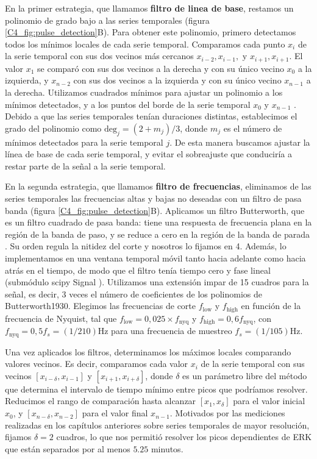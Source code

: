 \documentclass[./main.tex]{subfiles}
\begin{document}
En la primer estrategia, que llamamos \textbf{filtro de linea de base}, restamos un polinomio de grado bajo a las series temporales (figura \ref{C4_fig:pulse_detection}B). Para obtener este polinomio, primero detectamos todos los mínimos locales de cada serie temporal. Comparamos cada punto $x_i$ de la serie temporal con sus dos vecinos más cercanos $x_{i-2},x_{i-1}, \text{ y } x_{i+1},x_{i+1}$. El valor $x_1$ se comparó con sus dos vecinos a la derecha y con su único vecino $x_0$ a la izquierda, y $x_{n-2}$ con sus dos vecinos a la izquierda y con su único vecino $x_{n-1}$ a la derecha. Utilizamos cuadrados mínimos para ajustar un polinomio a los mínimos detectados, y a los puntos del borde de la serie temporal $x_0$ y $x_{n-1}$ \cite{Harris2020}. Debido a que las series temporales tenían duraciones distintas, establecimos el grado del polinomio como $\text{deg}_j = (2+m_j) / 3$, donde $m_j$ es el número de mínimos detectados para la serie temporal $j$. De esta manera buscamos ajustar la línea de base de cada serie temporal, y evitar el sobreajuste que conduciría a restar parte de la señal a la serie temporal.  



En la segunda estrategia, que llamamos \textbf{filtro de frecuencias}, eliminamos de las series temporales las frecuencias altas y bajas no deseadas con un filtro de pasa banda (figura \ref{C4_fig:pulse_detection}B). Aplicamos un filtro Butterworth, que es un filtro cuadrado de pasa banda: tiene una respuesta de frecuencia plana en la región de la banda de paso, y se reduce a cero en la región de la banda de parada \cite{Butterworth1930}. Su orden regula la nitidez del corte y nosotros lo fijamos en 4. Además, lo implementamos en una ventana temporal móvil tanto hacia adelante como hacia atrás en el tiempo, de modo que el filtro tenía tiempo cero y fase lineal (submódulo scipy Signal \cite{Virtanen2020}). Utilizamos una extensión impar de 15 cuadros para la señal, es decir, 3 veces el número de coeficientes de los polinomios de Butterworth1930. Elegimos las frecuencias de corte $f_{\text{low}}$ y $f_{\text{high}}$ en función de la frecuencia de Nyquist, tal que $f_{\text{low}}= 0,025 \times f_{\text{nyq}}$ y $f_{\text{high}}=0,6 f_{\text{nyq}}$, con $f_{\text{nyq}}=0,5 f_s =(1/210) $Hz para una frecuencia de muestreo $f_s=(1/105) $Hz.    



Una vez aplicados los filtros, determinamos los máximos locales comparando valores vecinos. Es decir, comparamos cada valor $x_i$ de la serie temporal con sus vecinos $[x_{i-\delta}, x_{i-1}]$ y $[x_{i+1}, x_{i+\delta}]$, donde $\delta$ es un parámetro libre del método que determina el intervalo de tiempo mínimo entre picos que podríamos resolver. Reducimos el rango de comparación hasta alcanzar $[x_1, x_\delta]$ para el valor inicial $x_0$, y $[x_{n-\delta}, x_{n-2}]$ para el valor final $x_{n-1}$. Motivados por las mediciones realizadas en los capítulos anteriores sobre series temporales de mayor resolución, fijamos $\delta = 2$ cuadros, lo que nos permitió resolver los picos dependientes de ERK que están separados por al menos $5.25$ minutos.
\end{document}
